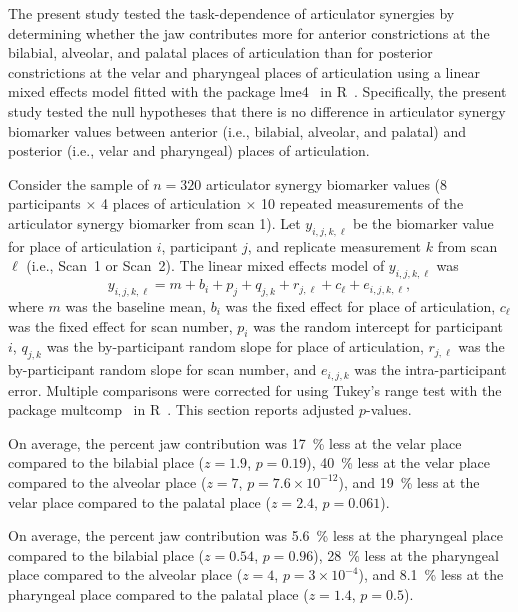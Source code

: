 \documentclass[reprint]{JASAnew}\usepackage[]{graphicx}\usepackage[]{color}
\begin{document}
The present study tested the task-dependence of articulator synergies by determining whether the jaw contributes more for anterior constrictions at the bilabial, alveolar, and palatal places of articulation than for posterior constrictions at the velar and pharyngeal places of articulation using a linear mixed effects model fitted with the package lme4~\citep{bates2015fitting} in R~\citep{r2017language}. Specifically, the present study tested the null hypotheses that there is no difference in articulator synergy biomarker values between anterior (i.e., bilabial, alveolar, and palatal) and posterior (i.e., velar and pharyngeal) places of articulation.

Consider the sample of $n=320$ articulator synergy biomarker values (\num{8} participants $\times$ \num{4} places of articulation $\times$ \num{10} repeated measurements of the articulator synergy biomarker from scan \num{1}). Let $y_{i,j,k,\ell}$ be the biomarker value for place of articulation $i$, participant $j$, and replicate measurement $k$ from scan $\ell$ (i.e., Scan~\num{1} or Scan~\num{2}). The linear mixed effects model of $y_{i,j,k,\ell}$ was 
%
\begin{equation}
y_{i,j,k,\ell} = m + b_i + p_j + q_{j,k} + r_{j,\ell} + c_\ell + e_{i,j,k,\ell},
\end{equation}
%
where $m$ was the baseline mean, $b_i$ was the fixed effect for place of articulation, $c_\ell$ was the fixed effect for scan number, $p_i$ was the random intercept for participant $i$, $q_{j,k}$ was the by-participant random slope for place of articulation, $r_{j,\ell}$ was the by-participant random slope for scan number, and $e_{i,j,k}$ was the intra-participant error. Multiple comparisons were corrected for using Tukey's range test with the package multcomp~\citep{hothorn2008simultaneous} in R~\citep{r2017language}. This section reports adjusted $p$-values. 

%
On average, the percent jaw contribution was 
%
%
\SI{17}{\percent} 
less at the velar place compared to the bilabial place
($z=1.9$, 
$p=0.19$),
%
%
\SI{40}{\percent} 
less at the velar place compared to the alveolar place
($z=7$, 
$p=\ensuremath{7.6\times 10^{-12}}$), and
%
%
\SI{19}{\percent} 
less at the velar place compared to the palatal place
($z=2.4$, 
$p=0.061$).




%
On average, the percent jaw contribution was 
%
%
\SI{5.6}{\percent} 
less at the pharyngeal place compared to the bilabial place
($z=0.54$, 
$p=0.96$),
%
%
\SI{28}{\percent} 
less at the pharyngeal place compared to the alveolar place
($z=4$, 
$p=\ensuremath{3\times 10^{-4}}$), and
%
%
\SI{8.1}{\percent} 
less at the pharyngeal place compared to the palatal place
($z=1.4$, 
$p=0.5$).
\end{document}
